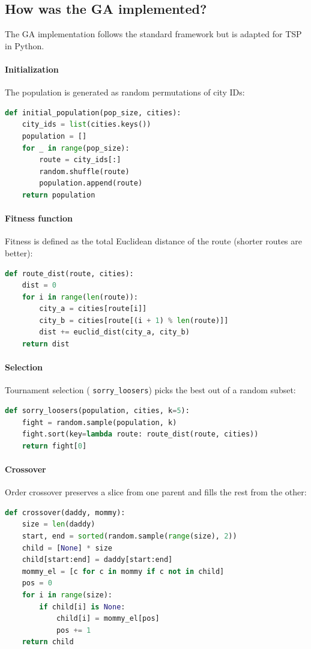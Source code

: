 \documentclass[conference]{IEEEtran}
\begin{document}
\subsection{How was the GA implemented?}
The GA implementation follows the standard framework but is adapted for TSP in Python.

\paragraph{Initialization}
The population is generated as random permutations of city IDs:
\begin{lstlisting}[language=Python]
def initial_population(pop_size, cities):
    city_ids = list(cities.keys())
    population = []
    for _ in range(pop_size):
        route = city_ids[:]
        random.shuffle(route)
        population.append(route)
    return population
\end{lstlisting}

\paragraph{Fitness function}
Fitness is defined as the total Euclidean distance of the route (shorter routes are better):
\begin{lstlisting}[language=Python]
def route_dist(route, cities):
    dist = 0
    for i in range(len(route)):
        city_a = cities[route[i]]
        city_b = cities[route[(i + 1) % len(route)]]
        dist += euclid_dist(city_a, city_b)
    return dist
\end{lstlisting}

\paragraph{Selection}
Tournament selection ( \texttt{sorry\_loosers}) picks the best out of a random subset:
\begin{lstlisting}[language=Python]
def sorry_loosers(population, cities, k=5):
    fight = random.sample(population, k)
    fight.sort(key=lambda route: route_dist(route, cities))
    return fight[0]
\end{lstlisting}

\paragraph{Crossover}
Order crossover preserves a slice from one parent and fills the rest from the other:
\begin{lstlisting}[language=Python]
def crossover(daddy, mommy):
    size = len(daddy)
    start, end = sorted(random.sample(range(size), 2))
    child = [None] * size
    child[start:end] = daddy[start:end]
    mommy_el = [c for c in mommy if c not in child]
    pos = 0
    for i in range(size):
        if child[i] is None:
            child[i] = mommy_el[pos]
            pos += 1
    return child
\end{lstlisting}
\end{document}
